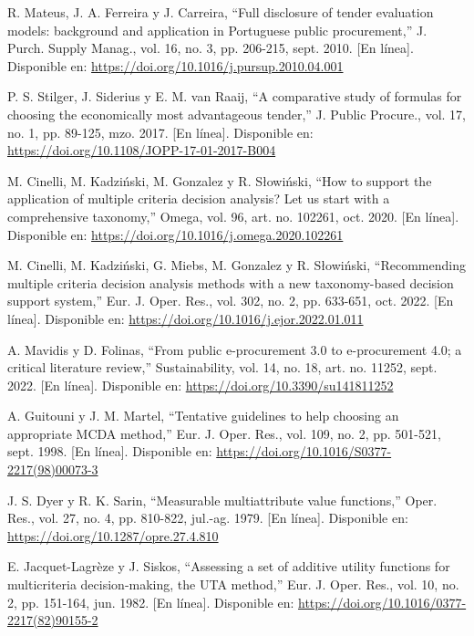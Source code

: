 \documentclass[12pt,a4paper]{article}
\newenvironment{reflist}{%
  \small\sloppy
  \begin{list}{}{%
    \setlength{\leftmargin}{1cm}%
    \setlength{\itemindent}{-1cm}%
    \setlength{\itemsep}{8pt}%
    \setlength{\parsep}{0pt}%
    \setlength{\listparindent}{0pt}%
  }%
}{\end{list}}
\begin{document}
\begin{reflist}
\item[] [8] R. Mateus, J. A. Ferreira y J. Carreira, ``Full disclosure of tender evaluation models: background and application in Portuguese public procurement,'' J. Purch. Supply Manag., vol. 16, no. 3, pp. 206-215, sept. 2010. [En línea]. Disponible en: \url{https://doi.org/10.1016/j.pursup.2010.04.001}

\item[] [9] P. S. Stilger, J. Siderius y E. M. van Raaij, ``A comparative study of formulas for choosing the economically most advantageous tender,'' J. Public Procure., vol. 17, no. 1, pp. 89-125, mzo. 2017. [En línea]. Disponible en: \url{https://doi.org/10.1108/JOPP-17-01-2017-B004}

\item[] [10] M. Cinelli, M. Kadziński, M. Gonzalez y R. Słowiński, ``How to support the application of multiple criteria decision analysis? Let us start with a comprehensive taxonomy,'' Omega, vol. 96, art. no. 102261, oct. 2020. [En línea]. Disponible en: \url{https://doi.org/10.1016/j.omega.2020.102261}

\item[] [11] M. Cinelli, M. Kadziński, G. Miebs, M. Gonzalez y R. Słowiński, ``Recommending multiple criteria decision analysis methods with a new taxonomy-based decision support system,'' Eur. J. Oper. Res., vol. 302, no. 2, pp. 633-651, oct. 2022. [En línea]. Disponible en: \url{https://doi.org/10.1016/j.ejor.2022.01.011}

\item[] [12] A. Mavidis y D. Folinas, ``From public e-procurement 3.0 to e-procurement 4.0; a critical literature review,'' Sustainability, vol. 14, no. 18, art. no. 11252, sept. 2022. [En línea]. Disponible en: \url{https://doi.org/10.3390/su141811252}

\item[] [13] A. Guitouni y J. M. Martel, ``Tentative guidelines to help choosing an appropriate MCDA method,'' Eur. J. Oper. Res., vol. 109, no. 2, pp. 501-521, sept. 1998. [En línea]. Disponible en: \url{https://doi.org/10.1016/S0377-2217(98)00073-3}

\item[] [14] J. S. Dyer y R. K. Sarin, ``Measurable multiattribute value functions,'' Oper. Res., vol. 27, no. 4, pp. 810-822, jul.-ag. 1979. [En línea]. Disponible en: \url{https://doi.org/10.1287/opre.27.4.810}

\item[] [15] E. Jacquet-Lagrèze y J. Siskos, ``Assessing a set of additive utility functions for multicriteria decision-making, the UTA method,'' Eur. J. Oper. Res., vol. 10, no. 2, pp. 151-164, jun. 1982. [En línea]. Disponible en: \url{https://doi.org/10.1016/0377-2217(82)90155-2}


\end{reflist}
\end{document}
